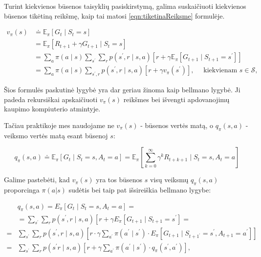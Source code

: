 \documentclass[a4paper, 12pt]{article}
\begin{document}
Turint kiekvienos būsenos taisyklių pasiskirstymą, galima suskaičiuoti kiekvienos būsenos tikėtiną reikšmę, kaip tai matosi \ref{eqn:tiketinaReiksme} formulėje.

\begin{equation}
\label{eqn:tiketinaReiksme}
\begin{aligned}
v_{\pi}(s) & \doteq \mathbb{E}_{\pi}\left[G_{t} \mid S_{t}=s\right] \\
&=\mathbb{E}_{\pi}\left[R_{t+1}+\gamma G_{t+1} \mid S_{t}=s\right] \\
&=\sum_{a} \pi(a \mid s) \sum_{s^{\prime}} \sum_{r} p\left(s^{\prime}, r \mid s, a\right)\left[r+\gamma \mathbb{E}_{\pi}\left[G_{t+1} \mid S_{t+1}=s^{\prime}\right]\right] \\
&=\sum_{a} \pi(a \mid s) \sum_{s^{\prime}, r} p\left(s^{\prime}, r \mid s, a\right)\left[r+\gamma v_{\pi}\left(s^{\prime}\right)\right], \quad \text { kiekvienam } s \in \mathcal{S},
\end{aligned}
\end{equation}

Šios formulės paskutinė lygybė yra dar geriau žinoma kaip bellmano lygybė. Ji padeda rekursiškai apskaičiuoti $v_{\pi}(s)$ reikšmes bei išvengti apdovanojimų kaupimo kompiuterio atmintyje.

Tačiau praktikoje mes naudojame ne $v_{\pi}(s)$ - būsenos vertės matą, o $q_{\pi}(s, a)$ - veiksmo vertės matą esant būsenoj $s$:

\begin{equation}
q_{\pi}(s, a) \doteq \mathbb{E}_{\pi}\left[G_{t} \mid S_{t}=s, A_{t}=a\right]=\mathbb{E}_{\pi}\left[\sum_{k=0}^{\infty} \gamma^{k} R_{t+k+1} \mid S_{t}=s, A_{t}=a\right]
\end{equation}

Galime pastebėti, kad $v_{\pi}(s)$ yra tos būsenos $s$ visų veiksmų $q_{\pi}(s, a)$ proporcinga $\pi(a|s)$ sudėtis bei taip pat išsireiškia bellmano lygybe:

\begin{equation}
\begin{aligned}
& q_{\pi}(s, a)=E_{\pi}\left[G_{t} \mid S_{t}=s, A_{t}=a\right]=\\
&=\sum_{s^{\prime}} \sum_{r} p\left(s^{\prime}, r \mid s, a\right)\left[r+\gamma E_{\pi}\left[G_{t+1} \mid S_{t+1}=s^{\prime}\right]=\right.\\
=& \sum_{s^{\prime}} \sum_{r} p\left(s^{\prime}, r\mid s, a\right)\left[r \cdot \gamma \sum_{a^{\prime}} \pi\left(a^{\prime} \mid s^{\prime}\right) \cdot E_{\pi}\left[G_{t+1} \mid S_{t+1^{\prime}}=s^{\prime}, A_{t+1}=a^{\prime}\right]\right] \\
=& \sum_{s^{\prime}} \sum_{r} p\left(s^{\prime} r \mid s, a\right)\left[r+\gamma \sum_{a^{\prime}} \pi\left(a^{\prime} \mid s^{\prime}\right) \cdot q_{\pi}\left(s^{\prime}, a^{\prime}\right)\right],
\end{aligned}
\end{equation}
\end{document}
